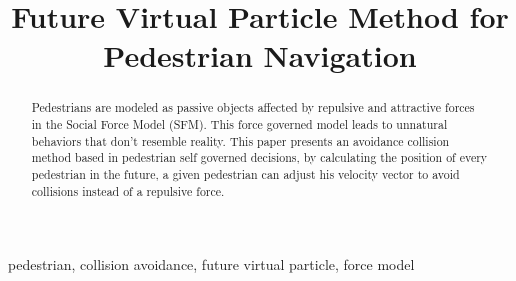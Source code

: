 \documentclass[draftclsnofoot]{IEEEtran}
\begin{document}
\title{Future Virtual Particle Method for Pedestrian Navigation}

\author{
    \and
    \and
}

\maketitle

\begin{abstract}
Pedestrians are modeled as passive objects affected by repulsive and attractive forces in the Social Force Model (SFM). This force governed model leads to unnatural behaviors that don't resemble reality.
This paper presents an avoidance collision method based in pedestrian self governed decisions, by calculating the position of every pedestrian in the future, a given pedestrian can adjust his velocity vector to avoid collisions instead of a repulsive force.
\end{abstract}

\begin{IEEEkeywords}
pedestrian, collision avoidance, future virtual particle, force model
\end{IEEEkeywords}




%
\IEEEpeerreviewmaketitle
\end{document}
